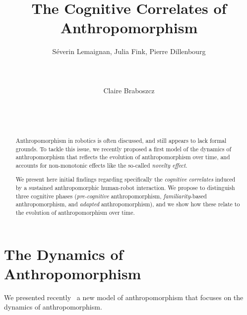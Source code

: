 \documentclass{sig-alternate-2013}
\begin{document}
\title{The Cognitive Correlates of Anthropomorphism}

\author{
\alignauthor
Séverin Lemaignan, Julia Fink, Pierre Dillenbourg\\
    \\
    \\
    \\
\alignauthor
Claire Braboszcz\\
    \\
    \\
    \\
}

\maketitle

\begin{abstract}

Anthropomorphism in robotics is often discussed, and still appears to lack
formal grounds. To tackle this issue, we recently proposed a first model of the
dynamics of anthropomorphism that reflects the evolution of anthropomorphism
over time, and accounts for non-monotonic effects like the so-called
\emph{novelty effect}.

We present here initial findings regarding specifically the \emph{cognitive
correlates} induced by a sustained anthropomorphic human-robot interaction. We
propose to distinguish three cognitive phases (\emph{pre-cognitive}
anthropomorphism, \emph{familiarity}-based anthropomorphism, and \emph{adapted}
anthropomorphism), and we show how these relate to the evolution of
anthropomorphism over time.

\end{abstract}

\section{The Dynamics of Anthropomorphism}
\label{sec:dynamics_model}

We presented recently~\cite{lemaignan2014dynamics} a new model of
anthropomorphism that focuses on the dynamics of anthropomorphism.
\end{document}
